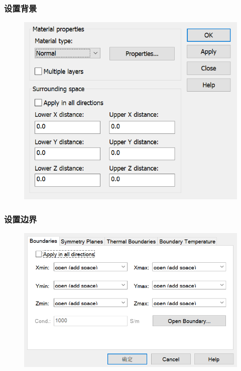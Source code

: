 \documentclass{../source/zjureport}
\begin{document}
            \subsubsection{设置背景}
            \begin{figure}[thp]
                \centering
                \includegraphics[]{figure/背景设置.png}
            \end{figure}
            \subsubsection{设置边界}
            \begin{figure}[thp]
                \centering
                \includegraphics[]{figure/设置边界.png}
            \end{figure}
            \newpage
\end{document}
